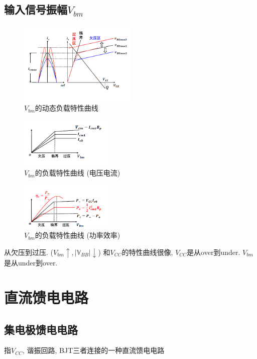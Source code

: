 \documentclass[a4paper]{report}
\begin{document}
\subsection{输入信号振幅$V_{bm}$}
\begin{figure}[H]
\centering
\includegraphics[width=0.5\textwidth]{power_amp_graph_vbm_1.png}
\caption{$V_{bm}$的动态负载特性曲线}
\end{figure}
\begin{figure}[H]
\centering
\includegraphics[width=0.4\textwidth]{power_amp_graph_vbm_2.png}
\caption{$V_{bm}$的负载特性曲线 (电压电流)}
\end{figure}
\begin{figure}[H]
\centering
\includegraphics[width=0.4\textwidth]{power_amp_graph_vbm_3.png}
\caption{$V_{bm}$的负载特性曲线 (功率效率)}
\end{figure}
从欠压到过压. ($V_{bm}\uparrow,|\mathbb{V}_{BB}|\downarrow$)
和$V_{CC}$的特性曲线很像, $V_{CC}$是从over到under. $V_{bm}$是从under到over. 
\section{直流馈电电路}
\subsection{集电极馈电电路}
指$V_{CC}$, 谐振回路, BJT三者连接的一种直流馈电电路
\end{document}
